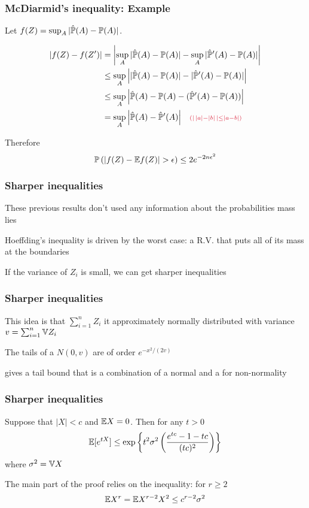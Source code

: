 \documentclass[12pt]{beamer}
\newcommand{\parenthetical}[2]{#1  \scriptstyle \alr{( #2)}}
\begin{document}
\begin{frame}[fragile]
\frametitle{McDiarmid's inequality: Example}
Let $f(Z) = \sup_A|\hat \P(A) - \P(A)|$.  

\begin{align*}
|f(Z) - f(Z') |
& = 
\left|\sup_A|\hat \P(A) - \P(A)|   - \sup_A|\hat \P'(A) - \P(A)| \right| \\
& \leq 
\sup_A\left||\hat \P(A) - \P(A)|   - |\hat \P'(A) - \P(A)| \right| \\
& \leq
\sup_A\left| \hat \P(A) - \P(A)- (\hat \P'(A) - \P(A)) \right| \\
& =
\sup_A\left| \hat \P(A) - \hat \P'(A) \right|  \parenthetical{\quad}{| \,|a| - |b|\,|\leq |a - b|}
\end{align*}

\vsp
Therefore
\[
\P\left( |f(Z) - \E f(Z)| > \epsilon\right) \leq 2e^{-2n\epsilon^2}
\]

\end{frame}

\begin{frame}[fragile]
\frametitle{Sharper inequalities}
These previous results don't used any information about  the probabilities mass lies

\vsp
Hoeffding's inequality is driven by the worst case: a R.V. that puts all of its mass at the boundaries

\vsp
If the variance of $Z_i$ is small, we can get sharper inequalities 
\end{frame}

\begin{frame}[fragile]
\frametitle{Sharper inequalities}

This idea is that $\sum_{i=1}^n Z_i$ it approximately normally distributed with variance $v = \sum_{i=1}^n \V Z_i$

\vsp
The tails of a $N(0,v)$ are of order $e^{-x^2/(2v)}$

\vsp
{} gives a tail bound that is a combination of a normal and a  for non-normality
\end{frame}
\begin{frame}[fragile]
\frametitle{Sharper inequalities}

Suppose that $|X| < c$ and $\E X = 0$. Then for any $t > 0$
\[
\E[e^{tX}] \leq \exp\left\{ t^2 \sigma^2 \left( \frac{e^{tc} - 1 -tc}{(tc)^2} \right) \right\}
\]
where $\sigma^2 = \V X$

\vsp
{} The main part of the proof relies on the inequality: for $r \geq 2$
\[
\E X^r = \E X^{r-2}X^2 \leq c^{r-2}\sigma^2
\]

\end{frame}
\end{document}

